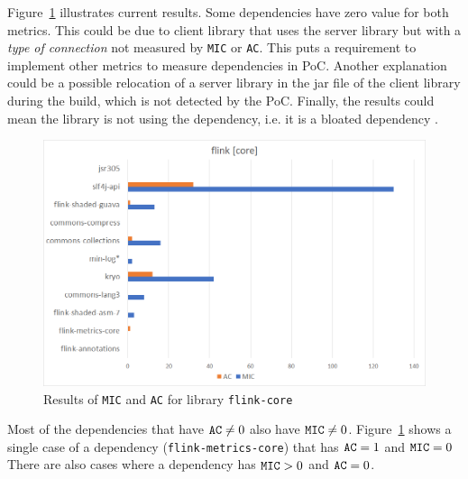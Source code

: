 \documentclass[a4paper]{article}
\begin{document}
Figure~\ref{fig:flink-core} illustrates current results. Some dependencies have zero value for both metrics. This could be due to client library that uses the server library but with a \textit{type of connection} not measured by \texttt{MIC} or \texttt{AC}. This puts a requirement to implement other metrics to measure dependencies in PoC. Another explanation could be a possible relocation of a server library in the jar file of the client library during the build, which is not detected by the PoC. Finally, the results could mean the library is not using the dependency, i.e. it is a bloated dependency \cite{soto2020comprehensive}.
%
\begin{figure}[ht]
\begin{center}
\includegraphics[width=\linewidth]{img/flink-core-excel.png}
\caption{Results of \texttt{MIC} and \texttt{AC} for library \texttt{flink-core}}
\label{fig:flink-core}
\end{center}
\end{figure}
%

Most of the dependencies that have $\verb|AC| \neq 0$ also have $\verb|MIC| \neq 0$. Figure~\ref{fig:flink-core} shows a single case of a dependency (\texttt{flink-metrics-core}) that has $\verb|AC| = 1$ and $\verb|MIC| = 0$ %
There are also cases where a dependency has $\verb|MIC| > 0$ and $\verb|AC| = 0$.
\end{document}
